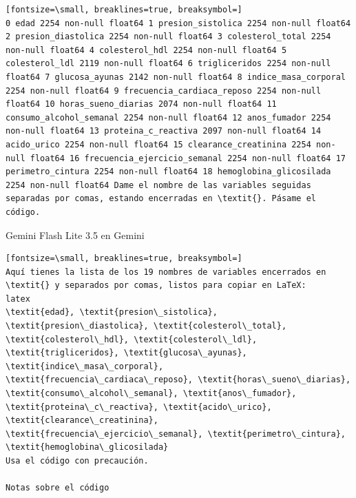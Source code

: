 \documentclass[12pt,a4paper,oneside]{book}
\begin{document}
\begin{iaprompt}
\begin{iaprompt}
\begin{Verbatim}[fontsize=\small, breaklines=true, breaksymbol=]
0 edad 2254 non-null float64 1 presion_sistolica 2254 non-null float64 2 presion_diastolica 2254 non-null float64 3 colesterol_total 2254 non-null float64 4 colesterol_hdl 2254 non-null float64 5 colesterol_ldl 2119 non-null float64 6 trigliceridos 2254 non-null float64 7 glucosa_ayunas 2142 non-null float64 8 indice_masa_corporal 2254 non-null float64 9 frecuencia_cardiaca_reposo 2254 non-null float64 10 horas_sueno_diarias 2074 non-null float64 11 consumo_alcohol_semanal 2254 non-null float64 12 anos_fumador 2254 non-null float64 13 proteina_c_reactiva 2097 non-null float64 14 acido_urico 2254 non-null float64 15 clearance_creatinina 2254 non-null float64 16 frecuencia_ejercicio_semanal 2254 non-null float64 17 perimetro_cintura 2254 non-null float64 18 hemoglobina_glicosilada 2254 non-null float64 Dame el nombre de las variables seguidas separadas por comas, estando encerradas en \textit{}. Pásame el código.
\end{Verbatim}
\end{iaprompt}
\begin{iaresp}{Gemini Flash Lite 3.5 en Gemini}
\begin{Verbatim}[fontsize=\small, breaklines=true, breaksymbol=]
Aquí tienes la lista de los 19 nombres de variables encerrados en \textit{} y separados por comas, listos para copiar en LaTeX:
latex
\textit{edad}, \textit{presion\_sistolica}, \textit{presion\_diastolica}, \textit{colesterol\_total}, \textit{colesterol\_hdl}, \textit{colesterol\_ldl}, \textit{trigliceridos}, \textit{glucosa\_ayunas}, \textit{indice\_masa\_corporal}, \textit{frecuencia\_cardiaca\_reposo}, \textit{horas\_sueno\_diarias}, \textit{consumo\_alcohol\_semanal}, \textit{anos\_fumador}, \textit{proteina\_c\_reactiva}, \textit{acido\_urico}, \textit{clearance\_creatinina}, \textit{frecuencia\_ejercicio\_semanal}, \textit{perimetro\_cintura}, \textit{hemoglobina\_glicosilada}
Usa el código con precaución.

Notas sobre el código


\end{Verbatim}
\end{iaresp}
\end{iaprompt}
\end{document}
